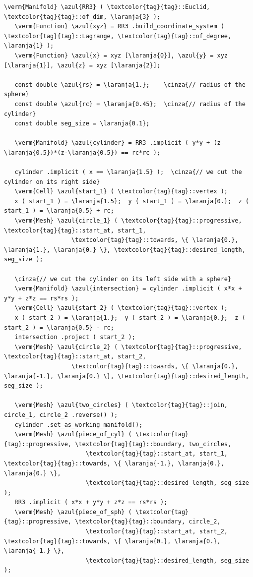 \begin{Verbatim}[commandchars=\\\{\},formatcom=\small\tt,frame=single,
   label=parag-\ref{\numb section 3.\numb parag 18}.cpp,rulecolor=\color{coment},
   baselinestretch=0.94,framesep=2mm                                            ]
   \verm{Manifold} \azul{RR3} ( \textcolor{tag}{tag}::Euclid, \textcolor{tag}{tag}::of_dim, \laranja{3} );
   \verm{Function} \azul{xyz} = RR3 .build_coordinate_system ( \textcolor{tag}{tag}::Lagrange, \textcolor{tag}{tag}::of_degree, \laranja{1} );
   \verm{Function} \azul{x} = xyz [\laranja{0}], \azul{y} = xyz [\laranja{1}], \azul{z} = xyz [\laranja{2}];

   const double \azul{rs} = \laranja{1.};    \cinza{// radius of the sphere}
   const double \azul{rc} = \laranja{0.45};  \cinza{// radius of the cylinder}
   const double seg_size = \laranja{0.1};

   \verm{Manifold} \azul{cylinder} = RR3 .implicit ( y*y + (z-\laranja{0.5})*(z-\laranja{0.5}) == rc*rc );

   cylinder .implicit ( x == \laranja{1.5} );  \cinza{// we cut the cylinder on its right side}
   \verm{Cell} \azul{start_1} ( \textcolor{tag}{tag}::vertex );
   x ( start_1 ) = \laranja{1.5};  y ( start_1 ) = \laranja{0.};  z ( start_1 ) = \laranja{0.5} + rc;
   \verm{Mesh} \azul{circle_1} ( \textcolor{tag}{tag}::progressive, \textcolor{tag}{tag}::start_at, start_1,
                   \textcolor{tag}{tag}::towards, \{ \laranja{0.}, \laranja{1.}, \laranja{0.} \}, \textcolor{tag}{tag}::desired_length, seg_size );

   \cinza{// we cut the cylinder on its left side with a sphere}
   \verm{Manifold} \azul{intersection} = cylinder .implicit ( x*x + y*y + z*z == rs*rs );
   \verm{Cell} \azul{start_2} ( \textcolor{tag}{tag}::vertex );
   x ( start_2 ) = \laranja{1.};  y ( start_2 ) = \laranja{0.};  z ( start_2 ) = \laranja{0.5} - rc;
   intersection .project ( start_2 );
   \verm{Mesh} \azul{circle_2} ( \textcolor{tag}{tag}::progressive, \textcolor{tag}{tag}::start_at, start_2,
                   \textcolor{tag}{tag}::towards, \{ \laranja{0.}, \laranja{-1.}, \laranja{0.} \}, \textcolor{tag}{tag}::desired_length, seg_size );

   \verm{Mesh} \azul{two_circles} ( \textcolor{tag}{tag}::join, circle_1, circle_2 .reverse() );
   cylinder .set_as_working_manifold();
   \verm{Mesh} \azul{piece_of_cyl} ( \textcolor{tag}{tag}::progressive, \textcolor{tag}{tag}::boundary, two_circles,
                       \textcolor{tag}{tag}::start_at, start_1, \textcolor{tag}{tag}::towards, \{ \laranja{-1.}, \laranja{0.}, \laranja{0.} \},
                       \textcolor{tag}{tag}::desired_length, seg_size                         );
   RR3 .implicit ( x*x + y*y + z*z == rs*rs );
   \verm{Mesh} \azul{piece_of_sph} ( \textcolor{tag}{tag}::progressive, \textcolor{tag}{tag}::boundary, circle_2,
                       \textcolor{tag}{tag}::start_at, start_2, \textcolor{tag}{tag}::towards, \{ \laranja{0.}, \laranja{0.}, \laranja{-1.} \},
                       \textcolor{tag}{tag}::desired_length, seg_size                         );
                       

\end{Verbatim}
